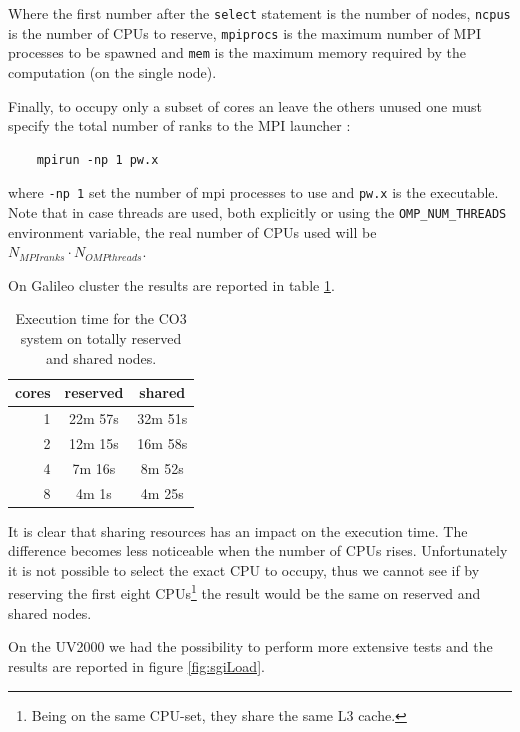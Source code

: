 \documentclass[a4paper,12pt]{article}
\newcommand\CO{CO3 }
\begin{document}
Where the first number after the \texttt{select} statement is the number of nodes, \texttt{ncpus} is the number of CPUs to reserve, \texttt{mpiprocs} is the maximum number of MPI processes to be spawned and \texttt{mem} is the maximum memory required by the computation (on the single node).

Finally, to occupy only a subset of cores an leave the others unused one must specify the total number of ranks to the MPI launcher :
\begin{verbatim}
	mpirun -np 1 pw.x
\end{verbatim}
where \texttt{-np 1} set the number of mpi processes to use and \texttt{pw.x} is the executable.
Note that in case threads are used, both explicitly or using the \texttt{OMP\_NUM\_THREADS} environment variable, the real number of CPUs used will be $N_{MPI ranks} \cdot N_{OMP threads}$.

On Galileo cluster the results are reported in table \ref{tab:galileoNodeLoad}.

\begin{table}[hhh!]
\centering
\begin{tabular}{r|cc}
\textbf{cores} & \textbf{reserved} & \textbf{shared} \\ \hline \hline
1              & 22m 57s           & 32m 51s         \\
2              & 12m 15s           & 16m 58s         \\
4              & 7m 16s            & 8m 52s          \\
8              & 4m 1s             & 4m 25s         
\end{tabular}
\caption{Execution time for the \CO system on totally reserved and shared nodes.}
\label{tab:galileoNodeLoad}
\end{table}

It is clear that sharing resources has an impact on the execution time. 
The difference becomes less noticeable when the number of CPUs rises. 
Unfortunately it is not possible to select the exact CPU to occupy, thus we cannot see if by reserving the first eight CPUs\footnote{Being on the same CPU-set, they share the same L3 cache.} the result would be the same on reserved and shared nodes.

On the UV2000 we had the possibility to perform more extensive tests and the results are reported in figure \ref{fig:sgiLoad}.
\end{document}
